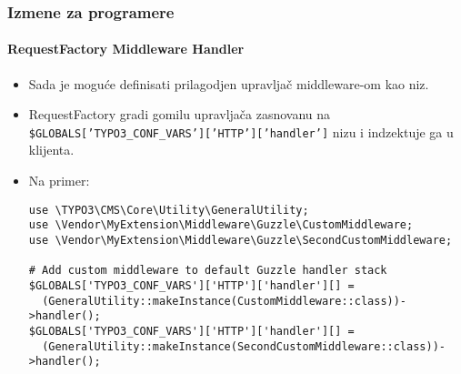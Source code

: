 \begin{frame}[fragile]
	\frametitle{Izmene za programere}
	\framesubtitle{RequestFactory Middleware Handler}

	\lstset{basicstyle=\tiny\ttfamily}

	\begin{itemize}
		\item Sada je moguće definisati prilagodjen upravljač middleware-om kao niz.
		\item RequestFactory gradi gomilu upravljača zasnovanu na \newline
			\small
				\texttt{\$GLOBALS['TYPO3\_CONF\_VARS']['HTTP']['handler']}
			\normalsize
			nizu i indzektuje ga u klijenta.
		\item Na primer:

\begin{lstlisting}
use \TYPO3\CMS\Core\Utility\GeneralUtility;
use \Vendor\MyExtension\Middleware\Guzzle\CustomMiddleware;
use \Vendor\MyExtension\Middleware\Guzzle\SecondCustomMiddleware;

# Add custom middleware to default Guzzle handler stack
$GLOBALS['TYPO3_CONF_VARS']['HTTP']['handler'][] =
  (GeneralUtility::makeInstance(CustomMiddleware::class))->handler();
$GLOBALS['TYPO3_CONF_VARS']['HTTP']['handler'][] =
  (GeneralUtility::makeInstance(SecondCustomMiddleware::class))->handler();
\end{lstlisting}

	\end{itemize}

\end{frame}


